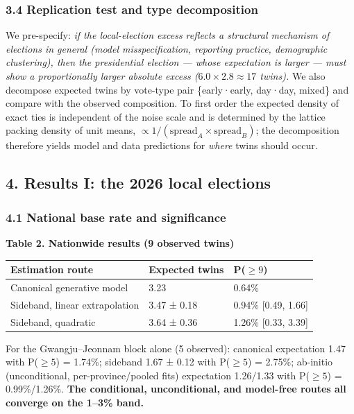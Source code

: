 \documentclass[
  11pt,
]{article}
\newcounter{none} %
\begin{document}
\subsubsection{3.4 Replication test and type
decomposition}\label{replication-test-and-type-decomposition}

We pre-specify: \emph{if the local-election excess reflects a structural
mechanism of elections in general (model misspecification, reporting
practice, demographic clustering), then the presidential election ---
whose expectation is larger --- must show a proportionally larger
absolute excess (\(6.0 \times 2.8 \approx 17\) twins).} We also
decompose expected twins by vote-type pair \{early·early, day·day,
mixed\} and compare with the observed composition. To first order the
expected density of exact ties is independent of the noise scale and is
determined by the lattice packing density of unit means,
\(\propto 1/(\text{spread}_A
\times \text{spread}_B)\); the decomposition therefore yields model and
data predictions for \emph{where} twins should occur.

\subsection{4. Results I: the 2026 local
elections}\label{results-i-the-2026-local-elections}

\subsubsection{4.1 National base rate and
significance}\label{national-base-rate-and-significance}

\textbf{Table 2. Nationwide results (9 observed twins)}

{\def\LTcaptype{none} %
\begin{longtable}[]{@{}lll@{}}
\toprule\noalign{}
Estimation route & Expected twins & P(\(\geq 9\)) \\
\midrule\noalign{}
\endhead
\bottomrule\noalign{}
\endlastfoot
Canonical generative model & 3.23 & 0.64\% \\
Sideband, linear extrapolation & 3.47 ± 0.18 & 0.94\% {[}0.49,
1.66{]} \\
Sideband, quadratic & 3.64 ± 0.36 & 1.26\% {[}0.33, 3.39{]} \\
\end{longtable}
}

For the Gwangju--Jeonnam block alone (5 observed): canonical expectation
1.47 with P(\(\geq 5\)) = 1.74\%; sideband 1.67 ± 0.12 with
P(\(\geq 5\)) = 2.75\%; ab-initio (unconditional, per-province/pooled
fits) expectation 1.26/1.33 with P(\(\geq 5\)) = 0.99\%/1.26\%.
\textbf{The conditional, unconditional, and model-free routes all
converge on the 1--3\% band.}
\end{document}
